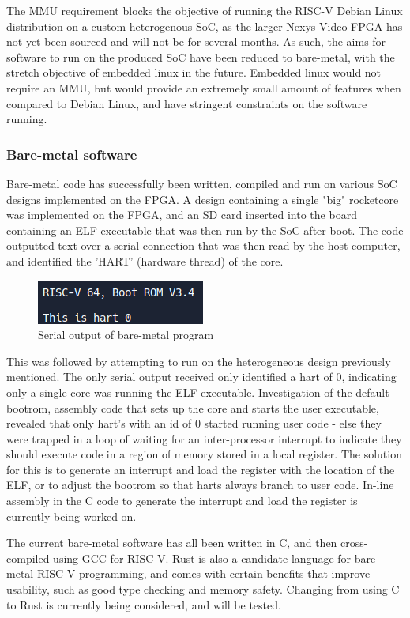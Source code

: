The MMU requirement blocks the objective of running the RISC-V Debian Linux distribution on a custom heterogenous SoC, as the larger Nexys Video FPGA has not yet been sourced and will not be for several months. As such, the aims for software to run on the produced SoC have been reduced to bare-metal, with the stretch objective of embedded linux in the future. Embedded linux would not require an MMU\cite{linux-memory}, but would provide an extremely small amount of features when compared to Debian Linux, and have stringent constraints on the software running.

\subsubsection{Bare-metal software}
Bare-metal code has successfully been written, compiled and run on various SoC designs implemented on the FPGA. A design containing a single "big" rocketcore was implemented on the FPGA, and an SD card inserted into the board containing an ELF executable that was then run by the SoC after boot. The code outputted text over a serial connection that was then read by the host computer, and identified the 'HART' (hardware thread) of the core.

\begin{figure}[h!]
    \centering
    \includegraphics[scale=1]{./img/bare-metal-hart-id.png}
    \caption{Serial output of bare-metal program}
    \label{fig:bare-metal-hart}
\end{figure}

This was followed by attempting to run on the heterogeneous design previously mentioned. The only serial output received only identified a hart of 0, indicating only a single core was running the ELF executable. Investigation of the default bootrom, assembly code that sets up the core and starts the user executable, revealed that only hart's with an id of 0 started running user code - else they were trapped in a loop of waiting for an inter-processor interrupt to indicate they should execute code in a region of memory stored in a local register. The solution for this is to generate an interrupt and load the register with the location of the ELF, or to adjust the bootrom so that harts always branch to user code. In-line assembly in the C code to generate the interrupt and load the register is currently being worked on.

The current bare-metal software has all been written in C, and then cross-compiled using GCC for RISC-V. Rust is also a candidate language for bare-metal RISC-V programming\cite{rust-riscv}, and comes with certain benefits that improve usability, such as good type checking and memory safety. Changing from using C to Rust is currently being considered, and will be tested.